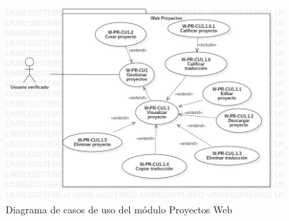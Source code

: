 \begin{figure}[H]
    \centering
    \includegraphics[width=400px]{capitulo4/web/modulo-proyectos-web.jpg}
    \caption{Diagrama de casos de uso del módulo Proyectos Web}
    \label{fig:modulo-proyectos-web}
\end{figure}


\newpage

\newpage

\newpage

\newpage

\newpage

\newpage

\newpage

\newpage

\newpage